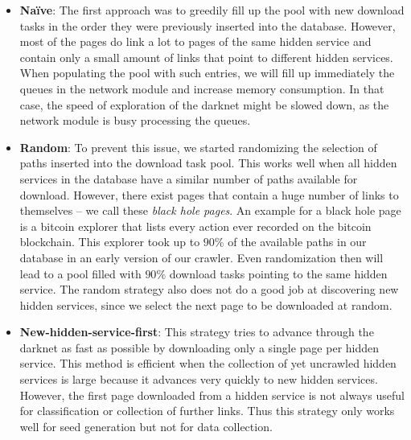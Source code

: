 \documentclass[USenglish,oneside,twocolumn]{article}
\begin{document}
\begin{itemize}
  \item \textbf{Naïve}: The first approach was to greedily fill up the pool with new download tasks in the order they were previously inserted into the database. However, most of the pages do link a lot to pages of the same hidden service and contain only a small amount of links that point to different hidden services. When populating the pool with such entries, we will fill up immediately the queues in the network module and increase memory consumption. In that case, the speed of exploration of the darknet might be slowed down, as the network module is busy processing the queues.
  \item \textbf{Random}: To prevent this issue, we started randomizing the selection of paths inserted into the download task pool. This works well when all hidden services in the database have a similar number of paths available for download. However, there exist pages that contain a huge number of links to themselves -- we call these \emph{black hole pages}. An example for a black hole page is a bitcoin explorer that lists every action ever recorded on the bitcoin blockchain. This explorer took up to $90\%$ of the available paths in our database in an early version of our crawler. Even randomization then will lead to a pool filled with $90\%$ download tasks pointing to the same hidden service. The random strategy also does not do a good job at discovering new hidden services, since we select the next page to be downloaded at random.
  \item \textbf{New-hidden-service-first}: This strategy tries to advance through the darknet as fast as possible by downloading only a single page per hidden service. This method is efficient when the collection of yet uncrawled hidden services is large because it advances very quickly to new hidden services. However, the first page downloaded from a hidden service is not always useful for classification or collection of further links. Thus this strategy only works well for seed generation but not for data collection.

\end{itemize}
\end{document}
